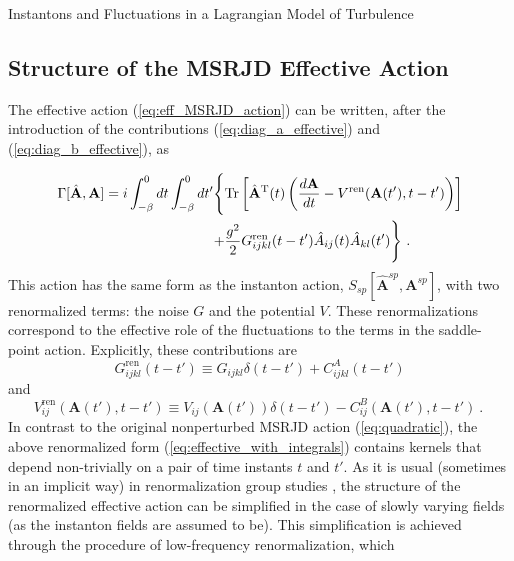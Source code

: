 \begin{chapter}{Instantons and Fluctuations in a Lagrangian Model of Turbulence}
\subsection{Structure of the MSRJD Effective Action}

The effective action (\ref{eq:eff_MSRJD_action}) can be written, after the introduction of the contributions (\ref{eq:diag_a_effective}) and (\ref{eq:diag_b_effective}), as

\begin{equation}\label{eq:effective_with_integrals}
\begin{split}
\Gamma [ \hat {\mathbf{A}}, {\mathbf{A}}] = i \int_{-\beta}^0 d t \int_{-\beta}^0 d t' \Bigg \{ 
&\mathrm{Tr} \left[ \hat {\mathbf{A}}^{\mathrm{T}}(t) \left( \frac{d\mathbf{A}}{dt} - V^{\mathrm{ren}}({\mathbf{A}}(t'),t-t') \right)
\right] \\
+ &\frac{g^2}{2} G_{ijkl}^{\mathrm{ren}} (t-t') \hat A_{ij} (t) \hat A_{kl} (t') \Bigg \} \ .
\end{split}
\end{equation}
This action has the same form as the instanton action, $S_{sp}[\hat {\mathbf{A}}^{sp},{\mathbf{A}}^{sp}]$, with two renormalized terms: the noise $G$ and the potential $V$. These renormalizations correspond to the effective role of the fluctuations to the terms in the saddle-point action. Explicitly, these contributions are
\begin{equation}\label{eq:noise_renormalized}
G_{ijkl}^{\mathrm{ren}} (t-t') \equiv  G_{ijkl} \delta(t-t') + C^A_{ijkl}(t-t') 
\end{equation}
and
\begin{equation}\label{eq:potential_renormalized}
V_{ij}^{\mathrm{ren}}({\mathbf{A}}(t'),t-t') \equiv V_{ij}({\mathbf{A}}(t')) \delta(t-t') - C^B_{ij}({\mathbf{A}}(t'),t-t') \ . \ 
\end{equation}
In contrast to the original nonperturbed MSRJD action (\ref{eq:quadratic}), the above renormalized form (\ref{eq:effective_with_integrals}) contains kernels that depend
non-trivially on a pair of time instants $t$ and $t'$. As it is usual (sometimes in an implicit way) in renormalization group
studies \parencite{amit2005,zinn2002,Peskin}
, the structure of the renormalized effective action can be simplified in the case of slowly varying fields
(as the instanton fields are assumed to be). This simplification is achieved through the procedure of low-frequency renormalization, which 

\end{chapter}
